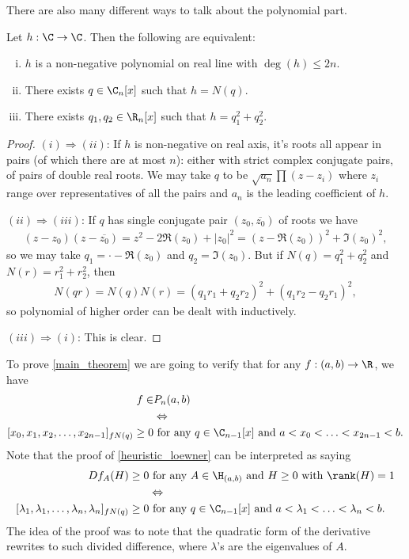 There are also many different ways to talk about the polynomial part.
\begin{lem}\label{polynomial_lemma}
	Let $h : \C \to \C$. Then the following are equivalent:
	\begin{enumerate}[(i)]
		\item $h$ is a non-negative polynomial on real line with  $\deg(h) \leq 2 n$.
		\item There exists $q \in \C_{n}[x]$ such that $h = N(q)$.
		\item There exists $q_{1}, q_{2} \in \R_{n}[x]$ such that $h = q_{1}^2 + q_{2}^2$.
	\end{enumerate}
\end{lem}
\begin{proof}
	$(i) \Rightarrow (ii)$: If $h$ is non-negative on real axis, it's roots all appear in pairs (of which there are at most $n$): either with strict complex conjugate pairs, of pairs of double real roots. We may take $q$ to be $\sqrt{a_{n}}\prod (z - z_{i})$ where $z_{i}$ range over representatives of all the pairs and $a_{n}$ is the leading coefficient of $h$.

	$(ii) \Rightarrow (iii)$: If $q$ has single conjugate pair $(z_{0}, \overline{z_{0}})$ of roots we have
	\begin{align*}
		(z - z_{0}) (z - \overline{z_{0}}) = z^2 - 2 \Re(z_{0}) + |z_{0}|^2 = (z - \Re(z_{0}))^2 + \Im(z_{0})^2,
	\end{align*}
	so we may take $q_{1} = \cdot - \Re(z_{0})$ and $q_{2} = \Im(z_{0})$. But if $ N(q) = q_{1}^2 + q_{2}^2$ and $ N(r) = r_{1}^2 + r_{2}^2$, then
	\begin{align*}
		N(q r) = N(q) N(r) = (q_{1} r_{1} + q_{2} r_{2})^2 + (q_{1} r_{2} - q_{2} r_{1})^2,
	\end{align*}
	so polynomial of higher order can be dealt with inductively.

	$(iii) \Rightarrow (i)$: This is clear.
\end{proof}

To prove \ref{main_theorem} we are going to verify that for any $f : (a, b) \to \R$, we have 
\begin{align*}
	f \in & P_{n}(a, b) \\
	&\Leftrightarrow \\
	[x_{0}, x_{1}, x_{2}, \ldots, x_{2 n - 1}]_{f N(q)} \geq 0 &\text{ for any $q \in \C_{n - 1}[x]$ and $a < x_{0} < \ldots < x_{2 n - 1} < b$}.
\end{align*}
Note that the proof of \ref{heuristic_loewner} can be interpreted as saying
\begin{align*}
	D f_{A}(H) \geq 0 &\text{ for any $A \in \H_{(a, b)}$ and $H \geq 0$ with $\rank(H) = 1$} \\
	&\Leftrightarrow \\
	[\lambda_{1}, \lambda_{1}, \ldots, \lambda_{n}, \lambda_{n}]_{f N(q)} \geq 0 &\text{ for any $q \in \C_{n - 1}[x]$ and $a < \lambda_{1} < \ldots < \lambda_{n} < b$}.
\end{align*}
The idea of the proof was to note that the quadratic form of the derivative rewrites to such divided difference, where $\lambda$'s are the eigenvalues of $A$.

